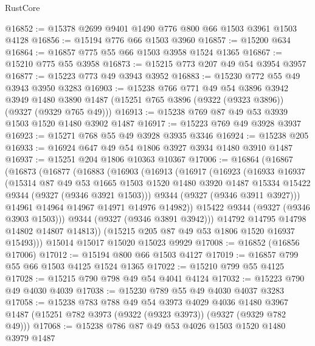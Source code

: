 \begin{lexlean}{RustCore}
\begin{coremodule}
@16852 := @15378 @2699 @9401 @1490 @776 @800 @66 @1503 @3961 @1503 @4128
@16856 := @15194 @776 @66 @1503 @3960
@16857 := @15200 @634
@16864 := @16857 @775 @55 @66 @1503 @3958 @1524 @1365
@16867 := @15210 @775 @55 @3958
@16873 := @15215 @773 @207 @49 @54 @3954 @3957
@16877 := @15223 @773 @49 @3943 @3952
@16883 := @15230 @772 @55 @49 @3943 @3950 @3283
@16903 := @15238
    @766
    @771
    @49
    @54
    @3896
    @3942
    @3949
    @1480
    @3890
    @1487
    (@15251 @765 @3896 (@9322 (@9323 @3896)) (@9327 (@9329 @765 @49)))
@16913 := @15238 @769 @87 @49 @53 @3939 @1503 @1520 @1480 @3902 @1487
@16917 := @15223 @769 @49 @3928 @3937
@16923 := @15271 @768 @55 @49 @3928 @3935 @3346
@16924 := @15238 @205
@16933 := @16924 @647 @49 @54 @1806 @3927 @3934 @1480 @3910 @1487
@16937 := @15251 @204 @1806 @10363 @10367
@17006 := @16864
    (@16867
      (@16873
        (@16877
          (@16883
            (@16903
              (@16913
                (@16917
                  (@16923
                    (@16933
                      @16937
                      (@15314
                        @87
                        @49
                        @53
                        @1665
                        @1503
                        @1520
                        @1480
                        @3920
                        @1487
                        @15334
                        @15422
                        @9344
                        (@9327 (@9346 @3921 @1503)))
                      @9344
                      (@9327 (@9346 @3911 @3927)))
                    @14961
                    @14964
                    @14967
                    @14971
                    @14976
                    @14982))
                @15422
                @9344
                (@9327 (@9346 @3903 @1503)))
              @9344
              (@9327 (@9346 @3891 @3942)))
            @14792
            @14795
            @14798
            @14802
            @14807
            @14813))
        (@15215 @205 @87 @49 @53 @1806 @1520 @16937 @15493)))
    @15014
    @15017
    @15020
    @15023
    @9929
@17008 := @16852 (@16856 @17006)
@17012 := @15194 @800 @66 @1503 @4127
@17019 := @16857 @799 @55 @66 @1503 @4125 @1524 @1365
@17022 := @15210 @799 @55 @4125
@17028 := @15215 @790 @798 @49 @54 @4041 @4124
@17032 := @15223 @790 @49 @4030 @4039
@17038 := @15230 @789 @55 @49 @4030 @4037 @3283
@17058 := @15238
    @783
    @788
    @49
    @54
    @3973
    @4029
    @4036
    @1480
    @3967
    @1487
    (@15251 @782 @3973 (@9322 (@9323 @3973)) (@9327 (@9329 @782 @49)))
@17068 := @15238 @786 @87 @49 @53 @4026 @1503 @1520 @1480 @3979 @1487

\end{coremodule}
\end{lexlean}
